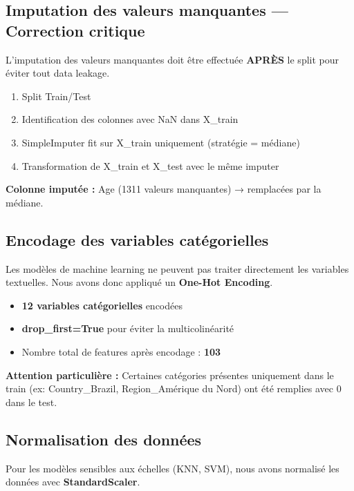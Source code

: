 \documentclass[11pt,a4paper]{article}
\begin{document}
\subsection{Imputation des valeurs manquantes — Correction critique}
L'imputation des valeurs manquantes doit être effectuée \textbf{APRÈS} le split pour 
éviter tout data leakage.

\begin{tcolorbox}[title=�� Bonne pratique respectée]
\begin{enumerate}
    \item Split Train/Test
    \item Identification des colonnes avec NaN dans X\_train
    \item SimpleImputer fit sur X\_train uniquement (stratégie = médiane)
    \item Transformation de X\_train et X\_test avec le même imputer
\end{enumerate}
\end{tcolorbox}

\textbf{Colonne imputée :} Age (1311 valeurs manquantes) → remplacées par la médiane.

\subsection{Encodage des variables catégorielles}
Les modèles de machine learning ne peuvent pas traiter directement les variables 
textuelles. Nous avons donc appliqué un \textbf{One-Hot Encoding}.

\begin{itemize}
    \item \textbf{12 variables catégorielles} encodées
    \item \textbf{drop\_first=True} pour éviter la multicolinéarité
    \item Nombre total de features après encodage : \textbf{103}
\end{itemize}

\textbf{Attention particulière :} Certaines catégories présentes uniquement dans 
le train (ex: Country\_Brazil, Region\_Amérique du Nord) ont été remplies avec 0 
dans le test.

\subsection{Normalisation des données}
Pour les modèles sensibles aux échelles (KNN, SVM), nous avons normalisé les données 
avec \textbf{StandardScaler}.
\end{document}
